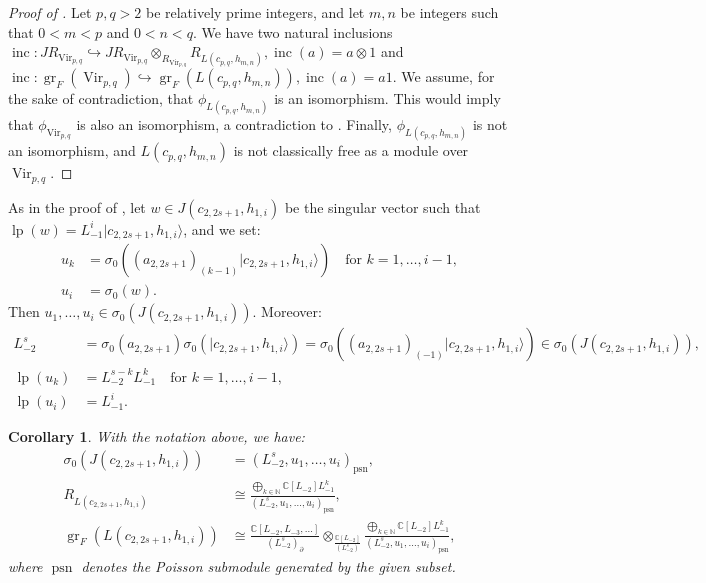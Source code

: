 \documentclass[a4paper, 12pt, reqno]{amsart}
\newtheorem{corollary}[theorem]{Corollary}
\theoremstyle{remark}
\DeclareMathOperator{\Vir}{Vir}
\DeclareMathOperator{\gr}{gr}
\DeclareMathOperator{\lp}{lp}
\DeclareMathOperator{\inc}{inc}
\DeclareMathOperator{\psn}{psn}
\begin{document}
\begin{proof}[Proof of ]
  Let $p, q > 2$ be relatively prime integers, and let $m, n$ be integers such that $0 < m < p$ and $0 < n < q$.
  We have two natural inclusions $\inc: JR_{\Vir_{p, q}} \hookrightarrow JR_{\Vir_{p, q}} \otimes_{R_{\Vir_{p, q}}} R_{L(c_{p, q}, h_{m, n})}, \inc(a) = a \otimes1$ and $\inc: \gr_F(\Vir_{p, q}) \hookrightarrow \gr_F(L(c_{p, q}, h_{m, n})), \inc(a) = a1$.
  We assume, for the sake of contradiction, that $\phi_{L(c_{p, q}, h_{m, n})}$ is an isomorphism.
  This would imply that $\phi_{\Vir_{p, q}}$ is also an isomorphism, a contradiction to .
  Finally, $\phi_{L(c_{p, q}, h_{m, n})}$ is not an isomorphism, and $L(c_{p, q}, h_{m, n})$ is not classically free as a module over $\Vir_{p, q}$.
\end{proof}

As in the proof of , let $w \in J(c_{2, 2s + 1}, h_{1, i})$ be the singular vector such that $\lp(w) = L_{-1}^i|c_{2, 2s + 1}, h_{1, i}\rangle$, and we set:
\begin{align*}
  u_k &= \sigma_0((a_{2, 2s + 1})_{(k - 1)}|c_{2, 2s + 1}, h_{1, i}\rangle) \quad \text{for $k = 1, \dots, i - 1$}, \\
  u_i &= \sigma_0(w).
\end{align*}
Then $u_1, \dots, u_i \in \sigma_0(J(c_{2, 2s + 1}, h_{1, i}))$.
Moreover:
\begin{align*}
  L_{-2}^s &= \sigma_0(a_{2, 2s + 1})\sigma_0(|c_{2, 2s + 1}, h_{1, i}\rangle) = \sigma_0((a_{2, 2s + 1})_{(-1)}|c_{2, 2s + 1}, h_{1, i}\rangle) \in \sigma_0(J(c_{2, 2s + 1}, h_{1, i})), \\
  \lp(u_k) &= L_{-2}^{s - k}L_{-1}^k \quad \text{for $k = 1, \dots, i - 1$}, \\
  \lp(u_i) &= L_{-1}^i.
\end{align*}

\begin{corollary}
  \label{crl:1}
  With the notation above, we have:
  \begin{align}
    \label{eq:11}
    \sigma_0(J(c_{2, 2s + 1}, h_{1, i})) &= (L_{-2}^s, u_1, \dots, u_i)_{\psn}, \\
    \label{eq:12}
    R_{L(c_{2, 2s + 1}, h_{1, i})} &\cong \frac{\bigoplus_{k \in \mathbb{N}}\mathbb{C}[L_{-2}]L_{-1}^k}{(L_{-2}^s, u_1, \dots, u_i)_{\psn}}, \\
    \label{eq:13}
    \gr_F(L(c_{2, 2s + 1}, h_{1, i})) &\cong \frac{\mathbb{C}[L_{-2}, L_{-3}, \dots]}{(L_{-2}^s)_{\partial}} \otimes_{\frac{\mathbb{C}[L_{-2}]}{(L_{-2}^s)}} \frac{\bigoplus_{k \in \mathbb{N}}\mathbb{C}[L_{-2}]L_{-1}^k}{(L_{-2}^s, u_1, \dots, u_i)_{\psn}},
  \end{align}
  where $\psn$ denotes the Poisson submodule generated by the given subset.
\end{corollary}
\end{document}
